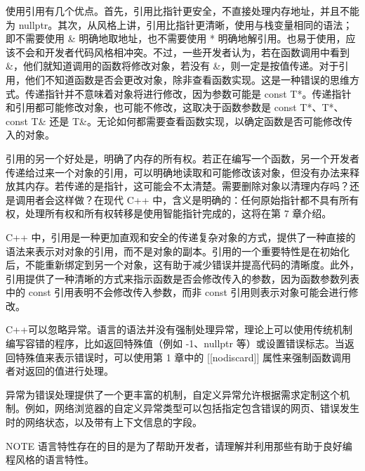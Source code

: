 使用引用有几个优点。首先，引用比指针更安全，不直接处理内存地址，并且不能为 nullptr。其次，从风格上讲，引用比指针更清晰，使用与栈变量相同的语法；即不需要使用 \& 明确地取地址，也不需要使用 * 明确地解引用。也易于使用，应该不会和开发者代码风格相冲突。不过，一些开发者认为，若在函数调用中看到 \&，他们就知道调用的函数将修改对象，若没有 \&，则一定是按值传递。对于引用，他们不知道函数是否会更改对象，除非查看函数实现。这是一种错误的思维方式。传递指针并不意味着对象将进行修改，因为参数可能是 const T*。传递指针和引用都可能修改对象，也可能不修改，这取决于函数参数是 const T*、T*、const T\& 还是 T\&。无论如何都需要查看函数实现，以确定函数是否可能修改传入的对象。

引用的另一个好处是，明确了内存的所有权。若正在编写一个函数，另一个开发者传递给过来一个对象的引用，可以明确地读取和可能修改该对象，但没有办法来释放其内存。若传递的是指针，这可能会不太清楚。需要删除对象以清理内存吗？还是调用者会这样做？在现代 C++ 中，含义是明确的：任何原始指针都不具有所有权，处理所有权和所有权转移是使用智能指针完成的，这将在第 7 章介绍。

C++ 中，引用是一种更加直观和安全的传递复杂对象的方式，提供了一种直接的语法来表示对对象的引用，而不是对象的副本。引用的一个重要特性是在初始化后，不能重新绑定到另一个对象，这有助于减少错误并提高代码的清晰度。此外，引用提供了一种清晰的方式来指示函数是否会修改传入的参数，因为函数参数列表中的 const 引用表明不会修改传入参数，而非 const 引用则表示对象可能会进行修改。


C++可以忽略异常。语言的语法并没有强制处理异常，理论上可以使用传统机制编写容错的程序，比如返回特殊值（例如 -1、nullptr 等）或设置错误标志。当返回特殊值来表示错误时，可以使用第 1 章中的 [[nodiscard]] 属性来强制函数调用者对返回的值进行处理。

异常为错误处理提供了一个更丰富的机制，自定义异常允许根据需求定制这个机制。例如，网络浏览器的自定义异常类型可以包括指定包含错误的网页、错误发生时的网络状态，以及带有上下文信息的字段。

\begin{myNotic}{NOTE}
语言特性存在的目的是为了帮助开发者，请理解并利用那些有助于良好编程风格的语言特性。
\end{myNotic}













